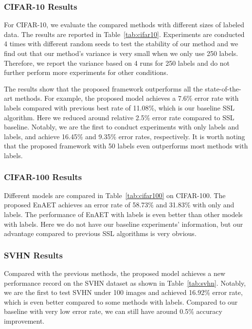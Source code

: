 \documentclass[journal]{IEEEtran}
\begin{document}
\subsubsection{CIFAR-10 Results}
 For CIFAR-10, we evaluate the compared methods with different sizes of labeled data.  The results are reported in Table~\ref{tab:cifar10}. Experiments are conducted 4 times with different random seeds to test the stability of our method and we find out that our method's variance is very small when we only use 250 labels. Therefore, we report the variance based on 4 runs for 250 labels and do not further perform more experiments for other conditions.


\par The results show that the proposed framework outperforms all the state-of-the-art methods. For example, the proposed model achieves a 7.6\% error rate with  labels compared with  previous best rate of 11.08\%, which is our baseline SSL algorithm. Here we reduced around relative 2.5\% error rate compared to SSL baseline.  Notably, we are the first to conduct experiments with only  labels and  labels, and achieve 16.45\% and 9.35\% error rates, respectively. It is worth noting that the proposed framework with 50 labels even outperforms most methods with  labels.

\subsubsection{CIFAR-100 Results}


Different models are compared in Table~\ref{tab:cifar100} on CIFAR-100.  The proposed EnAET achieves an error rate of 58.73\% and 31.83\% with only  and  labels. The performance of EnAET with  labels is even better than other models with  labels. Here we do not have our baseline experiments' information, but our advantage compared to previous SSL algorithms is very obvious.

\subsubsection{SVHN Results}
Compared with the previous methods, the proposed model achieves a new  performance record on the SVHN dataset as shown in Table~\ref{tab:svhn}. Notably, we are the first to test SVHN under 100 images and achieved 16.92\% error rate, which is even better compared to some methods with  labels. Compared to our baseline with very low error rate, we can still have around 0.5\% accuracy improvement.
\end{document}
